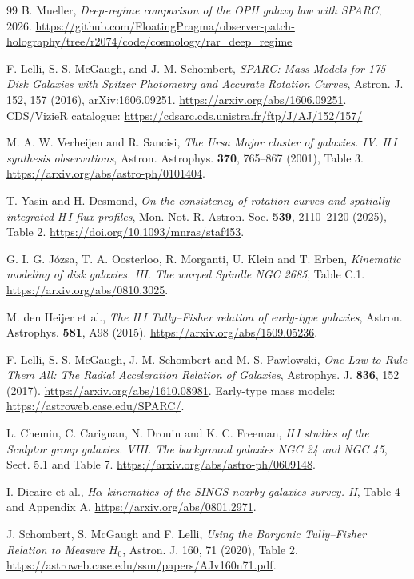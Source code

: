 \documentclass[11pt]{article}
\begin{document}
\begin{thebibliography}{99}
B. Mueller,
\emph{Deep-regime comparison of the OPH galaxy law with SPARC},
2026.
\url{https://github.com/FloatingPragma/observer-patch-holography/tree/r2074/code/cosmology/rar_deep_regime}

F. Lelli, S. S. McGaugh, and J. M. Schombert,
\emph{SPARC: Mass Models for 175 Disk Galaxies with Spitzer Photometry and Accurate Rotation Curves},
Astron. J. 152, 157 (2016), arXiv:1606.09251.
\url{https://arxiv.org/abs/1606.09251}. CDS/VizieR catalogue:
\url{https://cdsarc.cds.unistra.fr/ftp/J/AJ/152/157/}

M. A. W. Verheijen and R. Sancisi,
\emph{The Ursa Major cluster of galaxies. IV. H\,I synthesis observations},
Astron. Astrophys. \textbf{370}, 765--867 (2001), Table 3.
\url{https://arxiv.org/abs/astro-ph/0101404}.

T. Yasin and H. Desmond,
\emph{On the consistency of rotation curves and spatially integrated H\,I flux profiles},
Mon. Not. R. Astron. Soc. \textbf{539}, 2110--2120 (2025), Table 2.
\url{https://doi.org/10.1093/mnras/staf453}.

G. I. G. J\'ozsa, T. A. Oosterloo, R. Morganti, U. Klein and T. Erben,
\emph{Kinematic modeling of disk galaxies. III. The warped Spindle NGC 2685},
Table C.1. \url{https://arxiv.org/abs/0810.3025}.

M. den Heijer et al., \emph{The H\,I Tully--Fisher relation of early-type galaxies},
Astron. Astrophys. \textbf{581}, A98 (2015). \url{https://arxiv.org/abs/1509.05236}.

F. Lelli, S. S. McGaugh, J. M. Schombert and M. S. Pawlowski,
\emph{One Law to Rule Them All: The Radial Acceleration Relation of Galaxies},
Astrophys. J. \textbf{836}, 152 (2017). \url{https://arxiv.org/abs/1610.08981}.
Early-type mass models: \url{https://astroweb.case.edu/SPARC/}.

L. Chemin, C. Carignan, N. Drouin and K. C. Freeman,
\emph{H\,I studies of the Sculptor group galaxies. VIII. The background
galaxies NGC 24 and NGC 45}, Sect. 5.1 and Table 7.
\url{https://arxiv.org/abs/astro-ph/0609148}.

I. Dicaire et al., \emph{H$\alpha$ kinematics of the SINGS nearby
galaxies survey. II}, Table 4 and Appendix A.
\url{https://arxiv.org/abs/0801.2971}.

J. Schombert, S. McGaugh and F. Lelli, \emph{Using the Baryonic
Tully--Fisher Relation to Measure $H_0$}, Astron. J. 160, 71 (2020),
Table 2. \url{https://astroweb.case.edu/ssm/papers/AJv160n71.pdf}.


\end{thebibliography}
\end{document}
